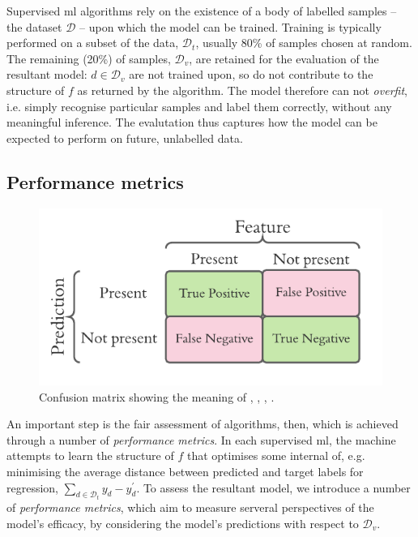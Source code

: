 \par 

Supervised \gls{ml} algorithms rely on the existence of a body of labelled samples 
    -- the dataset $\mathcal{D}$ -- upon which the model can be trained.
Training is typically performed on a subset of the data, $\mathcal{D}_t$, usually 80\% of samples chosen at random. 
The remaining (20\%) of samples, $\mathcal{D}_v$, are retained for the evaluation of the resultant model: 
    $d \in \mathcal{D}_v$ are not trained upon, so do not contribute to the structure of $f$ as returned by the algorithm.
    The model therefore can not \emph{overfit}, i.e. simply recognise particular samples and label them correctly,
    without any meaningful inference. 
The evalutation thus captures how the model can be expected to perform on future, unlabelled data. 
\par 

\subsection{Performance metrics}
\begin{figure}
    \begin{center}
        \includegraphics{contextual_review/figures/confusion_matrix.pdf}
    \end{center}
    \caption[Confusion matrix]{
        Confusion matrix showing the meaning of , , , .
    }
    \label{fig:confusion_matrix}
\end{figure}
An important step is the fair assessment of algorithms, then, 
    which is achieved through a number of \emph{performance metrics}.
In each supervised \gls{ml}, the machine attempts to learn the structure of $f$ that optimises some internal \gls{of}, 
    e.g. minimising the average distance between predicted and target labels for regression, $\sum\limits_{d \in \mathcal{D}_t} y_d - y^{\prime}_d$.
To assess the resultant model, we introduce a number of \emph{performance metrics}, 
    which aim to measure serveral perspectives of the model's efficacy, by considering the model's predictions with respect to $\mathcal{D}_v$. 
\par 

